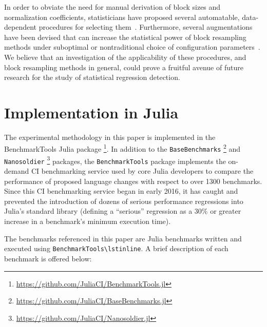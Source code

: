\documentclass[conference]{IEEEtran}
\begin{document}
In order to obviate the need for manual derivation of block sizes and normalization
coefficients, statisticians have proposed several automatable, data-dependent procedures for
selecting them~\cite{Politis2004,Bickel2008}. Furthermore, several augmentations have been
devised that can increase the statistical power of block resampling methods under suboptimal
or nontraditional choice of configuration parameters~\cite{Berg2010,Shao2013}. We believe
that an investigation of the applicability of these procedures, and block resampling methods
in general, could prove a fruitful avenue of future research for the study of statistical
regression detection.

\label{sec:implementation}
\section{Implementation in Julia}

The experimental methodology in this paper is implemented in the BenchmarkTools Julia
package \footnote{\url{https://github.com/JuliaCI/BenchmarkTools.jl}}. In addition to the
\lstinline|BaseBenchmarks| \footnote{\url{https://github.com/JuliaCI/BaseBenchmarks.jl}} and
\lstinline|Nanosoldier| \footnote{\url{https://github.com/JuliaCI/Nanosoldier.jl}} packages,
the \lstinline|BenchmarkTools| package implements the on-demand CI benchmarking service used
by core Julia developers to compare the performance of proposed language changes with
respect to over 1300 benchmarks. Since this CI benchmarking service began in early 2016, it
has caught and prevented the introduction of dozens of serious performance regressions into
Julia's standard library (defining a ``serious'' regression as a $30\%$ or greater increase
in a benchmark's minimum execution time).

The benchmarks referenced in this paper are Julia benchmarks written and executed using
\lstinline|BenchmarkTools\lstinline|. A brief description of each benchmark is offered
below:
\end{document}
